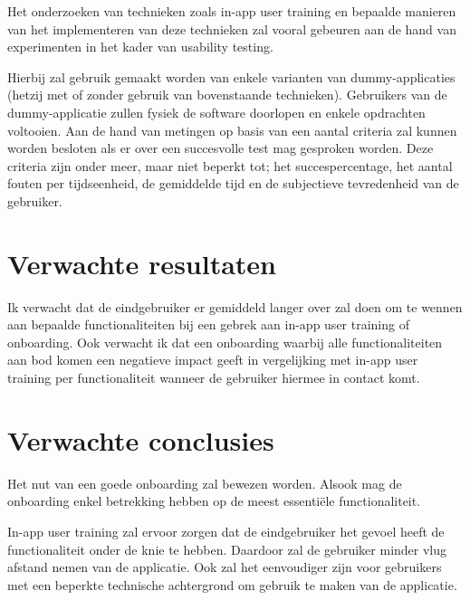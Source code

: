 Het onderzoeken van technieken zoals in-app user training en bepaalde manieren van het implementeren van deze technieken zal vooral gebeuren aan de hand van experimenten in het kader van usability testing.

Hierbij zal gebruik gemaakt worden van enkele varianten van dummy-applicaties (hetzij met of zonder gebruik van bovenstaande technieken). Gebruikers van de dummy-applicatie zullen fysiek de software doorlopen en enkele opdrachten voltooien. Aan de hand van metingen op basis van een aantal criteria zal kunnen worden besloten als er over een succesvolle test mag gesproken worden. Deze criteria zijn onder meer, maar niet beperkt tot; het succespercentage, het aantal fouten per tijdseenheid, de gemiddelde tijd en de subjectieve tevredenheid van de gebruiker.

\section{Verwachte resultaten}
\label{sec:verwachte_resultaten}

Ik verwacht dat de eindgebruiker er gemiddeld langer over zal doen om te wennen aan bepaalde functionaliteiten bij een gebrek aan in-app user training of onboarding. Ook verwacht ik dat een onboarding waarbij alle functionaliteiten aan bod komen een negatieve impact geeft in vergelijking met in-app user training per functionaliteit wanneer de gebruiker hiermee in contact komt.

\section{Verwachte conclusies}
\label{sec:verwachte_conclusies}

Het nut van een goede onboarding zal bewezen worden. Alsook mag de onboarding enkel betrekking hebben op de meest essentiële functionaliteit.

In-app user training zal ervoor zorgen dat de eindgebruiker het gevoel heeft de functionaliteit onder de knie te hebben. Daardoor zal de gebruiker minder vlug afstand nemen van de applicatie. Ook zal het eenvoudiger zijn voor gebruikers met een beperkte technische achtergrond om gebruik te maken van de applicatie.

